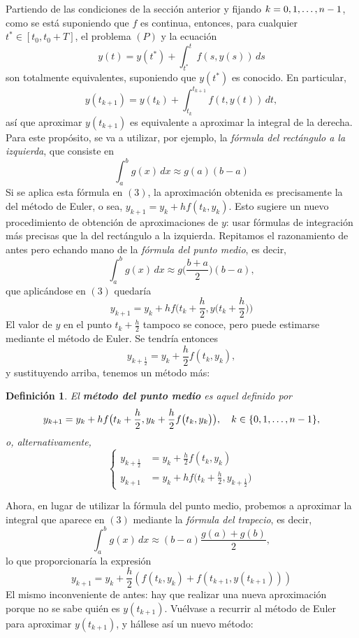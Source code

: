 \documentclass[11pt]{report}
\theoremstyle{mytheorem}
\theoremstyle{mydefinition}
\newtheorem{definition}{Definición}
\theoremstyle{myexample}
\newenvironment{cdefinition} %
  {\begin{mdframed}[
        linewidth=3pt,
        linecolor=c1,
        bottomline=false,
        topline=false,
        rightline=false,
        innerrightmargin=0pt,
        innertopmargin=0pt,
        innerbottommargin=0pt,
        innerleftmargin=1em, %
        skipabove=\baselineskip]
    \begin{definition}}
  {\end{definition}\end{mdframed}}
\newcommand{\mybf}[1]{\boldmath\textbf{\color{c1}#1}\unboldmath}
\begin{document}
Partiendo de las condiciones de la sección anterior y fijando $k = 0,1,\mathellipsis,n-1$, como se está suponiendo que $f$ es continua, entonces, para cualquier $t^* \in [t_0,t_0+T]$, el problema $(P)$ y la ecuación
\[y(t)= y(t^*)+\int_{t^*}^tf(s,y(s)) \, ds\]
son totalmente equivalentes, suponiendo que $y(t^*)$ es conocido. En particular,
\begin{equation}y(t_{k+1}) = y(t_k)+\int_{t_k}^{t_{k+1}}f(t,y(t)) \, dt,
\end{equation}
así que aproximar $y(t_{k+1})$ es equivalente a aproximar la integral de la derecha. Para este propósito, se va a utilizar, por ejemplo, la \emph{fórmula del rectángulo a la izquierda}, que consiste en
\[\int_a^b g(x) \, dx \approx g(a)(b-a)\]
Si se aplica esta fórmula en $(3)$, la aproximación obtenida es precisamente la del método de Euler, o sea, $y_{k+1}=y_k+hf(t_k,y_k)$. Esto sugiere un nuevo procedimiento de obtención de aproximaciones de $y$: usar fórmulas de integración más precisas que la del rectángulo a la izquierda. Repitamos el razonamiento de antes pero echando mano de la \emph{fórmula del punto medio}, es decir,
\[\int_a^bg(x) \, dx \approx g\bigl(\frac{b+a}{2}\bigr)(b-a),\]
que aplicándose en $(3)$ quedaría
\[y_{k+1}=y_k+hf\bigl(t_k+\frac{h}{2},y\bigl(t_k+\frac{h}{2}\bigr)\bigr)\]
El valor de $y$ en el punto $t_k+\frac{h}{2}$ tampoco se conoce, pero puede estimarse mediante el método de Euler. Se tendría entonces
\[y_{k+\frac{1}{2}}=y_k+\frac{h}{2}f(t_k,y_k),\]
y sustituyendo arriba, tenemos un método más:

\begin{cdefinition}
El \mybf{método del punto medio} es aquel definido por
\[y_{k+1}=y_k+hf\bigl(t_k+\frac{h}{2},y_k+\frac{h}{2}f\bigl(t_k,y_k\bigr)\bigr), \quad k \in \{0,1,\mathellipsis,n-1\},\]
o, alternativamente,
\[\left\{\begin{alignedat}{1}
    \displaystyle y_{k+\frac{1}{2}} &= y_k+\frac{h}{2}f(t_k,y_k) \\
    \displaystyle y_{k+1} &= y_k+hf\bigl(t_k+\frac{h}{2},y_{k+\frac{1}{2}}\bigr)
\end{alignedat}\right.\]
\end{cdefinition}

Ahora, en lugar de utilizar la fórmula del punto medio, probemos a aproximar la integral que aparece en $(3)$ mediante la \emph{fórmula del trapecio}, es decir,
\[\int_a^b g(x) \, dx \approx (b-a)\frac{g(a)+g(b)}{2},\]
lo que proporcionaría la expresión
\[y_{k+1}=y_k+\frac{h}{2}(f(t_k,y_{k})+f(t_{k+1},y(t_{k+1})))\]
El mismo inconveniente de antes: hay que realizar una nueva aproximación porque no se sabe quién es $y(t_{k+1})$. Vuélvase a recurrir al método de Euler para aproximar $y(t_{k+1})$, y hállese así un nuevo método:
\end{document}
